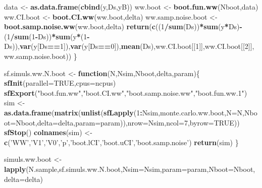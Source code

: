 \documentclass[]{book}
\newenvironment{Shaded}{\begin{snugshade}}{\end{snugshade}}
\newcommand{\ControlFlowTok}[1]{\textcolor[rgb]{0.13,0.29,0.53}{\textbf{#1}}}
\newcommand{\DataTypeTok}[1]{\textcolor[rgb]{0.13,0.29,0.53}{#1}}
\newcommand{\DecValTok}[1]{\textcolor[rgb]{0.00,0.00,0.81}{#1}}
\newcommand{\KeywordTok}[1]{\textcolor[rgb]{0.13,0.29,0.53}{\textbf{#1}}}
\newcommand{\NormalTok}[1]{#1}
\newcommand{\OperatorTok}[1]{\textcolor[rgb]{0.81,0.36,0.00}{\textbf{#1}}}
\newcommand{\OtherTok}[1]{\textcolor[rgb]{0.56,0.35,0.01}{#1}}
\newcommand{\StringTok}[1]{\textcolor[rgb]{0.31,0.60,0.02}{#1}}
\theoremstyle{definition}
\theoremstyle{definition}
\theoremstyle{definition}
\theoremstyle{remark}
\begin{document}
\begin{Shaded}
\begin{Highlighting}[]
\NormalTok{  data <-}\StringTok{ }\KeywordTok{as.data.frame}\NormalTok{(}\KeywordTok{cbind}\NormalTok{(y,Ds,yB))}
\NormalTok{  ww.boot <-}\StringTok{ }\KeywordTok{boot.fun.ww}\NormalTok{(Nboot,data)}
\NormalTok{  ww.CI.boot <-}\StringTok{ }\KeywordTok{boot.CI.ww}\NormalTok{(ww.boot,delta)}
\NormalTok{  ww.samp.noise.boot <-}\StringTok{ }\KeywordTok{boot.samp.noise.ww}\NormalTok{(ww.boot,delta)}
  \KeywordTok{return}\NormalTok{(}\KeywordTok{c}\NormalTok{((}\DecValTok{1}\OperatorTok{/}\KeywordTok{sum}\NormalTok{(Ds))}\OperatorTok{*}\KeywordTok{sum}\NormalTok{(y}\OperatorTok{*}\NormalTok{Ds)}\OperatorTok{-}\NormalTok{(}\DecValTok{1}\OperatorTok{/}\KeywordTok{sum}\NormalTok{(}\DecValTok{1}\OperatorTok{-}\NormalTok{Ds))}\OperatorTok{*}\KeywordTok{sum}\NormalTok{(y}\OperatorTok{*}\NormalTok{(}\DecValTok{1}\OperatorTok{-}\NormalTok{Ds)),}\KeywordTok{var}\NormalTok{(y[Ds}\OperatorTok{==}\DecValTok{1}\NormalTok{]),}\KeywordTok{var}\NormalTok{(y[Ds}\OperatorTok{==}\DecValTok{0}\NormalTok{]),}\KeywordTok{mean}\NormalTok{(Ds),ww.CI.boot[[}\DecValTok{1}\NormalTok{]],ww.CI.boot[[}\DecValTok{2}\NormalTok{]],ww.samp.noise.boot))}
\NormalTok{\}}

\NormalTok{sf.simuls.ww.N.boot <-}\StringTok{ }\ControlFlowTok{function}\NormalTok{(N,Nsim,Nboot,delta,param)\{}
  \KeywordTok{sfInit}\NormalTok{(}\DataTypeTok{parallel=}\OtherTok{TRUE}\NormalTok{,}\DataTypeTok{cpus=}\NormalTok{ncpus)}
  \KeywordTok{sfExport}\NormalTok{(}\StringTok{"boot.fun.ww"}\NormalTok{,}\StringTok{"boot.CI.ww"}\NormalTok{,}\StringTok{"boot.samp.noise.ww"}\NormalTok{,}\StringTok{"boot.fun.ww.1"}\NormalTok{)}
\NormalTok{  sim <-}\StringTok{ }\KeywordTok{as.data.frame}\NormalTok{(}\KeywordTok{matrix}\NormalTok{(}\KeywordTok{unlist}\NormalTok{(}\KeywordTok{sfLapply}\NormalTok{(}\DecValTok{1}\OperatorTok{:}\NormalTok{Nsim,monte.carlo.ww.boot,}\DataTypeTok{N=}\NormalTok{N,}\DataTypeTok{Nboot=}\NormalTok{Nboot,}\DataTypeTok{delta=}\NormalTok{delta,}\DataTypeTok{param=}\NormalTok{param)),}\DataTypeTok{nrow=}\NormalTok{Nsim,}\DataTypeTok{ncol=}\DecValTok{7}\NormalTok{,}\DataTypeTok{byrow=}\OtherTok{TRUE}\NormalTok{))}
  \KeywordTok{sfStop}\NormalTok{()}
  \KeywordTok{colnames}\NormalTok{(sim) <-}\StringTok{ }\KeywordTok{c}\NormalTok{(}\StringTok{'WW'}\NormalTok{,}\StringTok{'V1'}\NormalTok{,}\StringTok{'V0'}\NormalTok{,}\StringTok{'p'}\NormalTok{,}\StringTok{'boot.lCI'}\NormalTok{,}\StringTok{'boot.uCI'}\NormalTok{,}\StringTok{'boot.samp.noise'}\NormalTok{)}
  \KeywordTok{return}\NormalTok{(sim)}
\NormalTok{\}}

\NormalTok{simuls.ww.boot <-}\StringTok{ }\KeywordTok{lapply}\NormalTok{(N.sample,sf.simuls.ww.N.boot,}\DataTypeTok{Nsim=}\NormalTok{Nsim,}\DataTypeTok{param=}\NormalTok{param,}\DataTypeTok{Nboot=}\NormalTok{Nboot,}\DataTypeTok{delta=}\NormalTok{delta)}
\end{Highlighting}
\end{Shaded}
\end{document}
